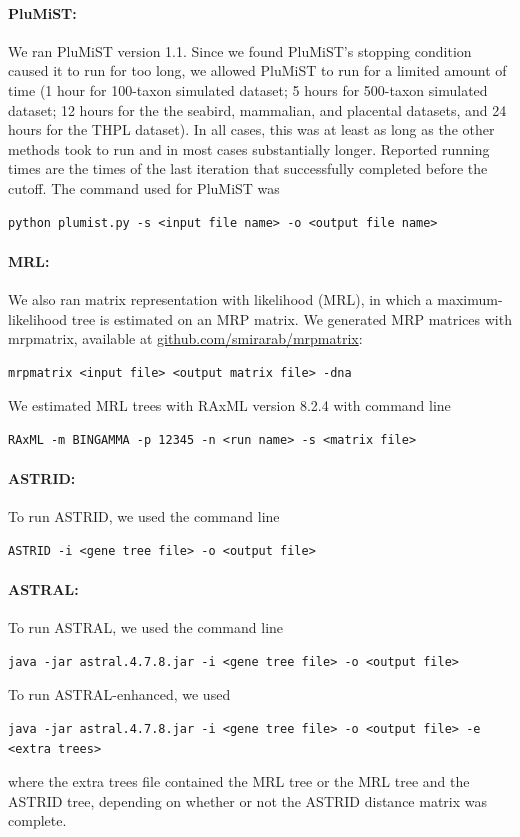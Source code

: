 \paragraph{PluMiST: }
We ran PluMiST version 1.1.  Since we found PluMiST's stopping
condition caused it to run for too long, we allowed PluMiST to run for
a limited amount of time (1 hour for 100-taxon simulated dataset; 5
hours for 500-taxon simulated dataset; 12 hours for the the seabird,
mammalian, and placental datasets, and 24 hours for the THPL
dataset). In all cases, this was at least as long as the other methods
took to run and in most cases substantially longer. Reported running
times are the times of the last iteration that successfully completed
before the cutoff. The command used for PluMiST was
\begin{verbatim}
python plumist.py -s <input file name> -o <output file name>
\end{verbatim}


\paragraph{MRL: }
We also ran matrix representation with likelihood (MRL), in which a
maximum-likelihood tree is estimated on an MRP matrix. We generated
MRP matrices with mrpmatrix, available at
\url{github.com/smirarab/mrpmatrix}:
\begin{verbatim}
mrpmatrix <input file> <output matrix file> -dna
\end{verbatim}
We estimated MRL trees with RAxML version 8.2.4 with command line 
\begin{verbatim}
RAxML -m BINGAMMA -p 12345 -n <run name> -s <matrix file>
\end{verbatim}

\paragraph{ASTRID:}
To run ASTRID, we used the command line
\begin{verbatim}
ASTRID -i <gene tree file> -o <output file>
\end{verbatim}

\paragraph{ASTRAL:}
To run ASTRAL, we used the command line
\begin{verbatim}
java -jar astral.4.7.8.jar -i <gene tree file> -o <output file>
\end{verbatim}
To run ASTRAL-enhanced, we used
\begin{verbatim}
java -jar astral.4.7.8.jar -i <gene tree file> -o <output file> -e
<extra trees>
\end{verbatim}
where the extra trees file contained the MRL tree or the MRL tree and
the ASTRID tree, depending on whether or not the ASTRID distance
matrix was complete.


